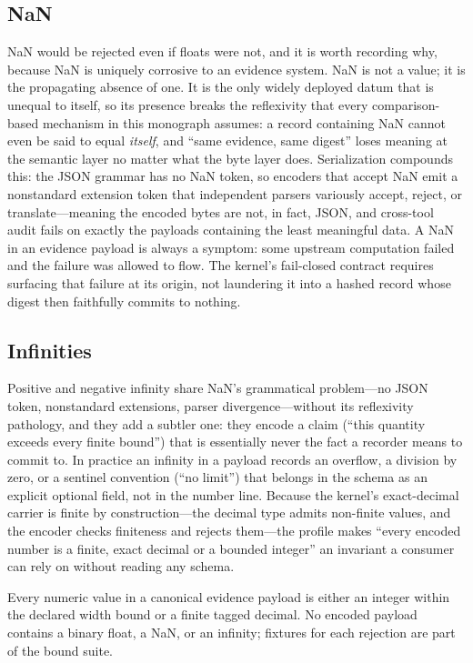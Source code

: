 \subsection{NaN}\label{ch05:nan}

NaN would be rejected even if floats were not, and it is worth recording
why, because NaN is uniquely corrosive to an evidence system. NaN is not a
value; it is the propagating absence of one. It is the only widely deployed
datum that is unequal to itself, so its presence breaks the reflexivity that
every comparison-based mechanism in this monograph assumes: a record
containing NaN cannot even be said to equal \emph{itself}, and ``same
evidence, same digest'' loses meaning at the semantic layer no matter what
the byte layer does. Serialization compounds this: the JSON grammar has no
NaN token, so encoders that accept NaN emit a nonstandard extension token
that independent parsers variously accept, reject, or translate---meaning
the encoded bytes are not, in fact, JSON, and cross-tool audit fails on
exactly the payloads containing the least meaningful data. A NaN in an
evidence payload is always a symptom: some upstream computation failed and
the failure was allowed to flow. The kernel's fail-closed contract requires
surfacing that failure at its origin, not laundering it into a hashed
record whose digest then faithfully commits to nothing.

\subsection{Infinities}\label{ch05:inf}

Positive and negative infinity share NaN's grammatical problem---no JSON
token, nonstandard extensions, parser divergence---without its reflexivity
pathology, and they add a subtler one: they encode a claim (``this quantity
exceeds every finite bound'') that is essentially never the fact a recorder
means to commit to. In practice an infinity in a payload records an
overflow, a division by zero, or a sentinel convention (``no limit'')
that belongs in the schema as an explicit optional field, not in the
number line. Because the kernel's exact-decimal carrier is finite by
construction---the decimal type admits non-finite values, and the encoder
checks finiteness and rejects them---the profile makes ``every encoded
number is a finite, exact decimal or a bounded integer'' an invariant a
consumer can rely on without reading any schema.

\begin{invariant}\label{ch05:inv:finite}
Every numeric value in a canonical evidence payload is either an integer
within the declared width bound or a finite tagged decimal. No encoded
payload contains a binary float, a NaN, or an infinity; fixtures for each
rejection are part of the bound suite.
\end{invariant}

